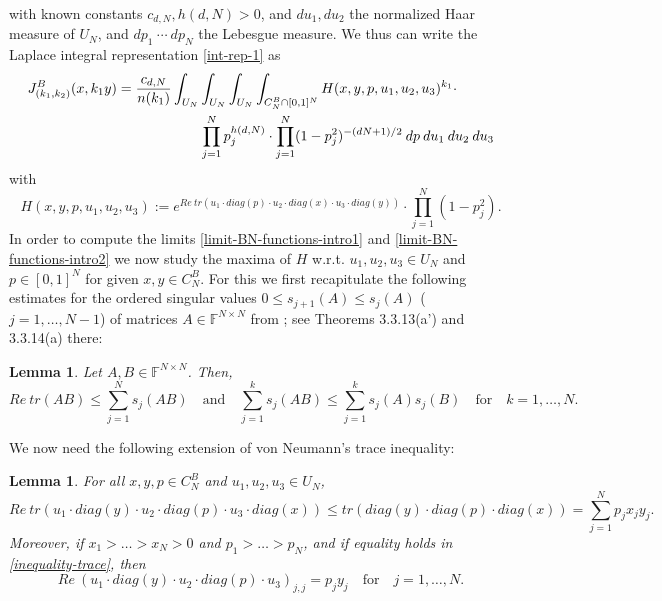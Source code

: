 \documentclass[reqno]{amsart}
\theoremstyle{plain}
\newtheorem{lemma}[theorem]{Lemma}
\theoremstyle{definition}
\numberwithin{equation}{section}
\begin{document}
with known constants $c_{d,N}, h(d,N)>0$, and $du_1, du_2$  the  normalized Haar measure of $U_N$, and
$ dp_1 \> \cdots\> dp_N$  the Lebesgue measure. We thus can write 
the Laplace integral representation \eqref{int-rep-1} as
\begin{align}\label{int-rep-2}
  J_{(k_1,k_2)}^B(x,k_1 y)=\frac{c_{d,N}}{n(k_1)} &
  \int_{U_N}\int_{U_N}\int_{U_N} \int_{C_N^B\cap [0,1]^N} H(x,y,p, u_1,u_2,u_3)^{k_1} \cdot \\
&\quad\quad \prod_{j=1}^N p_j^{h(d,N)} \cdot\prod_{j=1}^N (1-p_j^2)^{-(dN+1)/2} \> dp \> du_1 \> du_2\> du_3
\notag  \end{align}
with
\begin{equation}\label{int-rep-3}
  H(x,y,p, u_1,u_2,u_3):= e^{Re\> tr(u_1 \cdot diag(p) \cdot  u_2 \cdot  diag(x) \cdot u_3  \cdot diag(y))}\cdot\prod_{j=1}^N (1-p_j^2).
  \end{equation}
In order to compute the limits \eqref{limit-BN-functions-intro1} and \eqref{limit-BN-functions-intro2} we now study the maxima of 
$H$ w.r.t. $u_1,u_2,u_3\in U_N$ and $p\in[0,1]^N$ for given $x,y\in C_N^B$.
For this we first recapitulate the following estimates for the ordered singular values $0\le s_{j+1}(A)\le s_j(A)$ ($j=1,\ldots, N-1$)
of matrices $ A\in \mathbb F^{N\times N}$ from \cite{HJ}; see  Theorems 3.3.13(a') and 3.3.14(a) there:

\begin{lemma}\label{estimates-singular-values} Let $ A,B\in \mathbb F^{N\times N}$. Then,
  $$ Re\> tr(AB)\le \sum_{j=1}^N s_j(AB) \quad\text{and}\quad
    \sum_{j=1}^k s_j(AB) \le \sum_{j=1}^k s_j(A)s_j(B) \quad\text{for}\quad k=1,\ldots,N .$$
\end{lemma}

We now need the following extension of von Neumann's trace inequality:

\begin{lemma}\label{maxima-cone1}
  For all $x,y,p\in C_N^B$ and $u_1,u_2,u_3\in U_N$,
  \begin{equation}\label{inequality-trace}  Re\> tr(u_1 \cdot diag(y) \cdot  u_2 \cdot  diag(p) \cdot u_3  \cdot diag(x)) \le
    tr( diag(y) \cdot  diag(p) \cdot  diag(x))=\sum_{j=1}^Np_jx_jy_j.\end{equation}
  Moreover, if $x_1>\ldots>x_N>0$ and $p_1>\ldots>p_N$, and if equality holds in \eqref{inequality-trace}, then
  \begin{equation}\label{equality-trace}
     Re\> (u_1 \cdot diag(y) \cdot  u_2 \cdot  diag(p) \cdot u_3 )_{j,j}=p_jy_j \quad\text{for}\quad j=1,\ldots,N.
    \end{equation}
\end{lemma}
\end{document}
